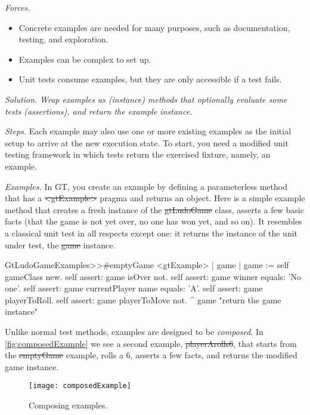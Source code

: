 \documentclass[acmsmall,screen,authorversion,nonacm]{acmart} %
\newcommand\cp[1]{\nbe{Cesare}{#1}{olive}} %
\newcommand\dd[1]{\nbe{Daniel}{#1}{magenta}} %
\newcommand{\patsec}[1]{\noindent\textit{#1.}\xspace}
\begin{document}
\patsec{Forces}
\begin{itemize}[---]
\item Concrete examples are needed for many purposes, such as documentation, testing, and exploration.
\item Examples can be complex to set up.
\item Unit tests consume examples, but they are only accessible if a test fails.
\end{itemize}

\patsec{Solution}
\emph{Wrap examples as (instance) methods that optionally evaluate some tests (assertions), 
and return the example instance.}

\patsec{Steps}
Each example may also use one or more existing examples as the initial setup to arrive at the new execution state.
To start, you need a modified unit testing framework in which tests return the exercised fixture, namely, an example.

\patsec{Examples}
In GT, you create an example by defining a parameterless method that has a \st{<gtExample>} pragma and returns an object.
Here is a simple example method that creates a fresh instance of the \st{gtLudoGame} class, asserts a few basic facts (\ie that the game is not yet over, no one has won yet, and so on).
It resembles a classical unit test in all respects except one: it returns the instance of the unit under test, \ie the \st{game} instance.


\begin{code}
GtLudoGameExamples>>#emptyGame
	<gtExample>
	| game |
	game := self gameClass new.
	self assert: game isOver not.
	self assert: game winner equals: 'No one'.
	self assert: game currentPlayer name equals: 'A'.
	self assert: game playerToRoll.
	self assert: game playerToMove not.
	^ game  "return the game instance"
\end{code}

Unlike normal test methods, examples are designed to be \emph{composed}.
In \autoref{fig:composedExample} we see a second example, \st{playerArolls6}, that starts from the \st{emptyGame} example, rolls a $6$, asserts a few facts, and returns the modified game instance.

\begin{figure}[h]
  \texttt{[image: composedExample]}
  \caption{Composing examples.}
  \label{fig:composedExample}
\end{figure}
\end{document}
